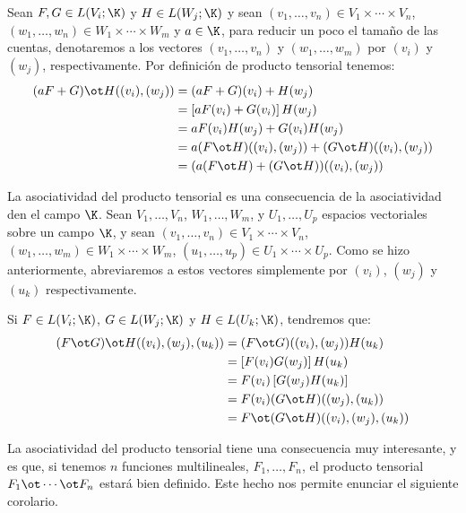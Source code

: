 Sean $F, G \in L(V_i;\K)$ y $H \in L(W_j;\K)$ y sean $(v_1,
	\ldots, v_n) \in V_1 \times \cdots \times V_n$, $(w_1, \ldots, w_n) \in W_1 \times
	\cdots \times W_m$ y $a \in \K$, para reducir un poco el tamaño de las
cuentas, denotaremos a los vectores $(v_1,\ldots,v_n)$ y $(w_1,\ldots,w_m)$
por $(v_i)$ y $(w_j)$, respectivamente. Por definición de producto tensorial
tenemos:
\begin{align*}
	(aF + G) \ot H ((v_i),(w_j)) & = (aF + G)(v_i) + H(w_j)                  \\
	                             & = \left[ aF(v_i) + G(v_i) \right] H(w_j)  \\
	                             & = aF(v_i)H(w_j) + G(v_i)H(w_j)            \\
	                             & = a(F \ot H)((v_i),(w_j))
	+ (G \ot H) ((v_i),(w_j))                                                \\
	                             & = (a (F \ot H) + (G \ot H)) ((v_i),(w_j))
\end{align*}

La asociatividad del producto tensorial es una consecuencia de la asociatividad
den el campo $\K$. Sean $V_1, \ldots, V_n$, $W_1,\ldots,W_m$, y $U_1,
	\ldots,U_p$ espacios vectoriales sobre un campo $\K$, y sean
$(v_1, \ldots, v_n) \in V_1 \times \cdots \times V_n$, $(w_1, \ldots, w_m)
	\in W_1 \times \cdots \times W_m$, $(u_1, \ldots, u_p) \in U_1 \times \cdots
	\times U_p$. Como se hizo anteriormente, abreviaremos a estos vectores
simplemente por $(v_i)$, $(w_j)$ y $(u_k)$ respectivamente.

Si $F \in L(V_i;\K)$, $G \in L(W_j;\K)$ y $H \in L(U_k;
	\K)$, tendremos que:
\begin{align*}
	(F \ot G) \ot H((v_i),(w_j),(u_k)) & = (F \ot G)((v_i),(w_j))H(u_k)       \\
	                                   & = \left[ F(v_i)G(w_j) \right] H(u_k) \\
	                                   & = F(v_i)\left[ G(w_j)H(u_k) \right]  \\
	                                   & = F(v_i)(G \ot H)((w_j),(u_k))       \\
	                                   & = F \ot (G \ot H)((v_i),(w_j),(u_k))
\end{align*}

La asociatividad del producto tensorial tiene una consecuencia muy interesante,
y es que, si tenemos $n$ funciones multilineales, $F_1, \ldots, F_n$, el
producto tensorial $F_1 \ot \cdots \ot F_n$ estará bien definido. Este hecho
nos permite enunciar el siguiente corolario.


